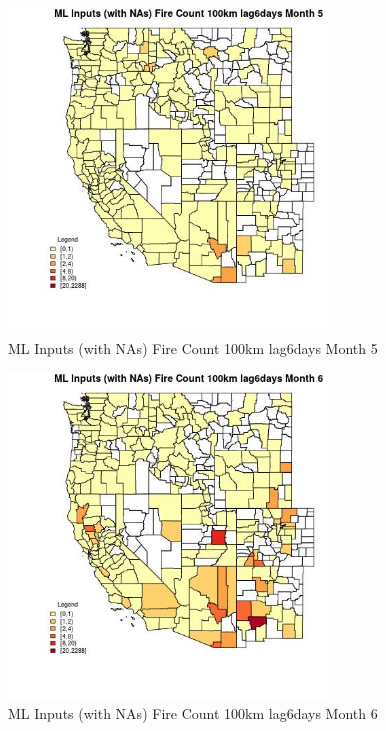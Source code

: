 \begin{figure} 
\centering  
\includegraphics[width=0.77\textwidth]{Code_Outputs/Report_ML_input_PM25_Step4_part_e_de_duplicated_aves_compiled_2019-05-20wNAs_CountyFire_Count_100km_lag6daysmedianMonth5.jpg} 
\caption{\label{fig:Report_ML_input_PM25_Step4_part_e_de_duplicated_aves_compiled_2019-05-20wNAsCountyFire_Count_100km_lag6daysmedianMonth5}ML Inputs (with NAs) Fire Count 100km lag6days Month 5} 
\end{figure} 
 

\begin{figure} 
\centering  
\includegraphics[width=0.77\textwidth]{Code_Outputs/Report_ML_input_PM25_Step4_part_e_de_duplicated_aves_compiled_2019-05-20wNAs_CountyFire_Count_100km_lag6daysmedianMonth6.jpg} 
\caption{\label{fig:Report_ML_input_PM25_Step4_part_e_de_duplicated_aves_compiled_2019-05-20wNAsCountyFire_Count_100km_lag6daysmedianMonth6}ML Inputs (with NAs) Fire Count 100km lag6days Month 6} 
\end{figure} 
 

